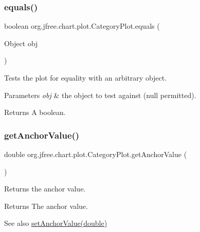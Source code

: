 \subsubsection{\texorpdfstring{equals()}{equals()}}
{\footnotesize\ttfamily boolean org.\+jfree.\+chart.\+plot.\+Category\+Plot.\+equals (\begin{DoxyParamCaption}\item[{Object}]{obj }\end{DoxyParamCaption})}

Tests the plot for equality with an arbitrary object.


\begin{DoxyParams}{Parameters}
{\em obj} & the object to test against ({\ttfamily null} permitted).\\
\hline
\end{DoxyParams}
\begin{DoxyReturn}{Returns}
A boolean. 
\end{DoxyReturn}
\mbox{\label{classorg_1_1jfree_1_1chart_1_1plot_1_1_category_plot_a7436b0bcbd290c89709539ad0e7c91be}} 
\subsubsection{\texorpdfstring{get\+Anchor\+Value()}{getAnchorValue()}}
{\footnotesize\ttfamily double org.\+jfree.\+chart.\+plot.\+Category\+Plot.\+get\+Anchor\+Value (\begin{DoxyParamCaption}{ }\end{DoxyParamCaption})}

Returns the anchor value.

\begin{DoxyReturn}{Returns}
The anchor value.
\end{DoxyReturn}
\begin{DoxySeeAlso}{See also}
\mbox{\hyperlink{classorg_1_1jfree_1_1chart_1_1plot_1_1_category_plot_a38b54324604b152b74491a08b2661257}{set\+Anchor\+Value(double)}} 
\end{DoxySeeAlso}
\mbox{\label{classorg_1_1jfree_1_1chart_1_1plot_1_1_category_plot_a9fad81fe06afc8c95415bab459f204ee}} 

